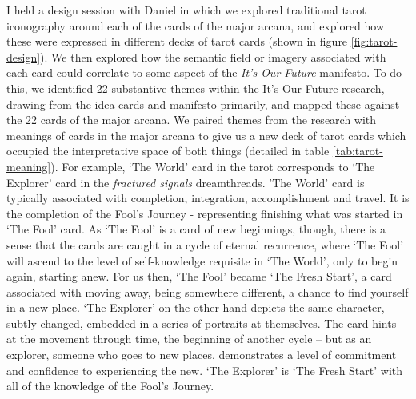 I held a design session with Daniel in which we explored traditional tarot iconography around each of the cards of the major arcana, and explored how these were expressed in different decks of tarot cards (shown in figure \ref{fig:tarot-design}). We then explored how the semantic field or imagery associated with each card could correlate to some aspect of the \emph{It’s Our Future} manifesto. To do this, we identified 22 substantive themes within the It’s Our Future research, drawing from the idea cards and manifesto primarily, and  mapped these against the 22 cards of the major arcana. We paired themes from the research with meanings of cards in the major arcana to give us a new deck of tarot cards which occupied the interpretative space of both things (detailed in table \ref{tab:tarot-meaning}). For example, `The World' card in the tarot corresponds to `The Explorer' card in the \textit{fractured signals} dreamthreads. ’The World’ card is typically associated with completion, integration, accomplishment and travel. It is the completion of the Fool’s Journey -  representing finishing what was started in ‘The Fool’ card. As ‘The Fool’ is a card of new beginnings, though, there is a sense that the cards are caught in a cycle of eternal recurrence, where `The Fool' will ascend to the level of self-knowledge requisite in `The World', only to begin again, starting anew. For us then, `The Fool' became ‘The Fresh Start’, a card associated with moving away, being somewhere different, a chance to find yourself in a new place. ‘The Explorer’ on the other hand depicts the same character, subtly changed, embedded in a series of portraits at themselves. The card hints at the movement through time, the beginning of another cycle – but as an explorer, someone who goes to new places, demonstrates a level of commitment and confidence to experiencing the new. `The Explorer' is `The Fresh Start' with all of the knowledge of the Fool’s Journey. 

